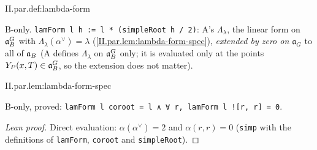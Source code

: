 \begin{definition}
\bonly
{}
\end{definition}
\begin{tfformal}{II.par.def:lambda-form}
\begin{tffidelity}
B-only. \texttt{lamForm l h := l * (simpleRoot h / 2)}: A's $\Lambda_\lambda$, the linear form on $\mathfrak{a}_B^G$ with $\Lambda_\lambda(\alpha^\vee)=\lambda$ (\cref{II.par.lem:lambda-form-spec}), \emph{extended by zero on $\mathfrak a_G$} to all of $\mathfrak{a}_B$ (A defines $\Lambda_\lambda$ on $\mathfrak{a}_B^G$ only; it is evaluated only at the points $Y_P(x,T)\in\mathfrak{a}_B^G$, so the extension does not matter).
\end{tffidelity}
\end{tfformal}

\begin{lemma}
\bonly
{}
\end{lemma}
\begin{tfformal}{II.par.lem:lambda-form-spec}
\begin{tffidelity}
B-only, proved: \texttt{lamForm l coroot = l ∧ ∀ r, lamForm l ![r, r] = 0}.
\end{tffidelity}
\end{tfformal}
\begin{proof}[Lean proof]
Direct evaluation: $\alpha(\alpha^\vee)=2$ and $\alpha(r,r)=0$ (\texttt{simp} with the definitions of \texttt{lamForm}, \texttt{coroot} and \texttt{simpleRoot}).
\end{proof}


